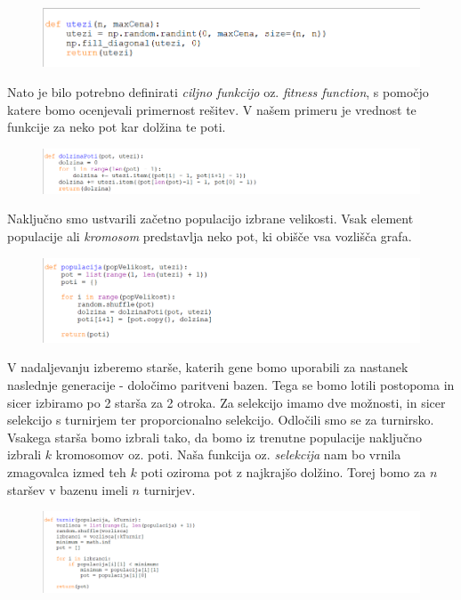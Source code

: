 \documentclass[12pt,a4paper]{amsart}
\theoremstyle{definition} %
\theoremstyle{plain} %
\begin{document}
\begin{figure}[ht]
\centering
\includegraphics[width=1\textwidth]{utezi}
\end{figure}

Nato je bilo potrebno definirati \textit{ciljno funkcijo} oz. \textit{fitness function}, s pomočjo katere bomo ocenjevali primernost rešitev. V našem primeru je vrednost te funkcije za neko pot kar dolžina te poti.

\begin{figure}[ht]
\centering
\includegraphics[width=1\textwidth]{dolzinapoti}
\end{figure}
Naključno smo ustvarili začetno populacijo izbrane velikosti. Vsak element populacije ali \textit{kromosom} predstavlja neko pot, ki obišče vsa vozlišča grafa. 
\\

\begin{figure}[ht]
\centering
\includegraphics[width=1\textwidth]{populacija}
\end{figure}
\newpage
V nadaljevanju izberemo starše, katerih gene bomo uporabili za nastanek naslednje generacije - določimo paritveni bazen. Tega se bomo lotili postopoma in sicer izbiramo po 2 starša za 2 otroka. Za selekcijo imamo dve možnosti, in sicer selekcijo s turnirjem ter proporcionalno selekcijo. Odločili smo se za turnirsko. Vsakega starša bomo izbrali tako, da bomo iz trenutne populacije naključno izbrali  $k$ kromosomov oz. poti. Naša funkcija oz. \textit{selekcija} nam bo vrnila zmagovalca izmed teh  $k$ poti oziroma pot z najkrajšo dolžino. Torej bomo za $n$ staršev v bazenu imeli $n$ turnirjev.

\begin{figure}[ht]
\centering
\includegraphics[width=1\textwidth]{turnir}
\end{figure}
\end{document}
